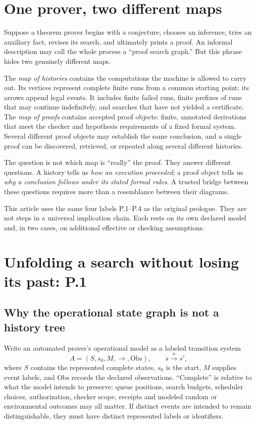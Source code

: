 \documentclass[11pt,letterpaper]{article}
\theoremstyle{plaincompact}
\begin{document}
\section{One prover, two different maps}
Suppose a theorem prover begins with a conjecture, chooses an inference, tries an auxiliary fact, revises its search, and ultimately prints a proof. An informal description may call the whole process a ``proof search graph.'' But this phrase hides two genuinely different maps.

The \emph{map of histories} contains the computations the machine is allowed to carry out. Its vertices represent complete finite runs from a common starting point; its arrows append legal events. It includes finite failed runs, finite prefixes of runs that may continue indefinitely, and searches that have not yielded a certificate. The \emph{map of proofs} contains accepted proof objects: finite, annotated derivations that meet the checker and hypothesis requirements of a fixed formal system. Several different proof objects may establish the same conclusion, and a single proof can be discovered, retrieved, or repeated along several different histories.

The question is not which map is ``really'' the proof. They answer different questions. A history tells us \emph{how an execution proceeded}; a proof object tells us \emph{why a conclusion follows under its stated formal rules}. A trusted bridge between these questions requires more than a resemblance between their diagrams.

This article uses the same four labels P.1--P.4 as the original prologue. They are not steps in a universal implication chain. Each rests on its own declared model and, in two cases, on additional effective or checking assumptions.

\section{Unfolding a search without losing its past: P.1}
\subsection{Why the operational state graph is not a history tree}
Write an automated prover's operational model as a labeled transition system
\[
A=(S,s_0,M,\longrightarrow,\mathrm{Obs}),\qquad s\xrightarrow{a}s',
\]
where $S$ contains the represented complete states, $s_0$ is the start, $M$ supplies event labels, and $\mathrm{Obs}$ records the declared observations. ``Complete'' is relative to what the model intends to preserve: queue positions, search budgets, scheduler choices, authorization, checker scope, receipts and modeled random or environmental outcomes may all matter. If distinct events are intended to remain distinguishable, they must have distinct represented labels or identifiers.
\end{document}
